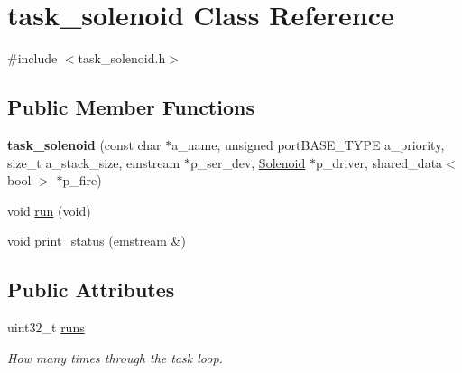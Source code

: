 \hypertarget{classtask__solenoid}{\section{task\-\_\-solenoid \-Class \-Reference}
\label{classtask__solenoid}
}


{\ttfamily \#include $<$task\-\_\-solenoid.\-h$>$}

\subsection*{\-Public \-Member \-Functions}
\begin{DoxyCompactItemize}
\item 
\hypertarget{classtask__solenoid_abd7c0ec45737d5494d0965eb6d6c1829}{{\bfseries task\-\_\-solenoid} (const char $\ast$a\-\_\-name, unsigned port\-B\-A\-S\-E\-\_\-\-T\-Y\-P\-E a\-\_\-priority, size\-\_\-t a\-\_\-stack\-\_\-size, emstream $\ast$p\-\_\-ser\-\_\-dev, \hyperlink{classSolenoid}{\-Solenoid} $\ast$p\-\_\-driver, shared\-\_\-data$<$ bool $>$ $\ast$p\-\_\-fire)}\label{classtask__solenoid_abd7c0ec45737d5494d0965eb6d6c1829}

\item 
void \hyperlink{classtask__solenoid_a99433e5b865772cf0103dcb7b135a1cb}{run} (void)
\item 
void \hyperlink{classtask__solenoid_a17936c9619b02d50e2aaa9f713848db8}{print\-\_\-status} (emstream \&)
\end{DoxyCompactItemize}
\subsection*{\-Public \-Attributes}
\begin{DoxyCompactItemize}
\item 
\hypertarget{classtask__solenoid_a2f7770e99d1b6d3023cb5666cd2b4231}{uint32\-\_\-t \hyperlink{classtask__solenoid_a2f7770e99d1b6d3023cb5666cd2b4231}{runs}}\label{classtask__solenoid_a2f7770e99d1b6d3023cb5666cd2b4231}

\begin{DoxyCompactList}\small\item\em \-How many times through the task loop. \end{DoxyCompactList}\end{DoxyCompactItemize}
